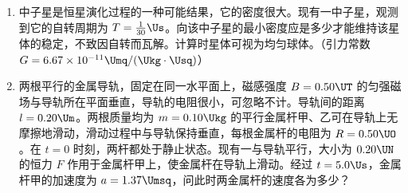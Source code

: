 \documentclass[\gkver]{gaokaozhenti}
\begin{document}
\begin{enumerate}
{（3）因为游标为 50 分度，所以游标卡尺的精确度为 $\frac{1}{50}\Umm=0.02\Umm$，另外游标卡尺不需要估读，读出待测电阻的长度为 $0.800\Ucm$，直径为 $1\Umm+47\times0.02\Umm=1.94\Umm=0.194\Ucm$。

（4）将数据代入 $\rho=\frac{RS}{l}=R\frac{\pi d^{2}}{4l}$，得 $\rho=8.46\times10^{-2}\UOm$。
}

\item
中子星是恒星演化过程的一种可能结果，它的密度很大。现有一中子星，观测到它的自转周期为 $T=\frac{1}{30}\Us$。向该中子星的最小密度应是多少才能维持该星体的稳定，不致因自转而瓦解。计算时星体可视为均匀球体。（引力常数 $G=6.67\times10^{-11}\Umq/(\Ukg\cdot\Usq)$）


\item
两根平行的金属导轨，固定在同一水平面上，磁感强度 $B=0.50\UT$ 的匀强磁场与导轨所在平面垂直，导轨的电阻很小，可忽略不计。导轨间的距离 $l=0.20\Um$。两根质量均为 $m=0.10\Ukg$ 的平行金属杆甲、乙可在导轨上无摩擦地滑动，滑动过程中与导轨保持垂直，每根金属杆的电阻为 $R=0.50\UO$。在 $t=0$ 时刻，两杆都处于静止状态。现有一与导轨平行，大小为 $0.20\UN$ 的恒力 $F$ 作用于金属杆甲上，使金属杆在导轨上滑动。经过 $t=5.0\Us$，金属杆甲的加速度为 $a=1.37\Umsq$，问此时两金属杆的速度各为多少？


\end{enumerate}
\end{document}
